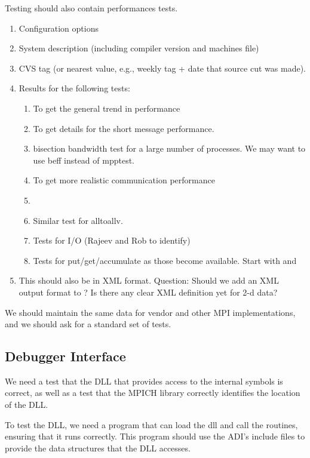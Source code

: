 \documentclass{article}
\begin{document}
Testing should also contain performances tests.
\begin{enumerate}
\item Configuration options
\item System description (including compiler version and machines file)
\item CVS tag (or nearest value, e.g., weekly tag + date that source
cut was made).
\item Results for the following tests:
    \begin{enumerate}
    \item {} To get the general trend in performance
    \item {} To get details for the short message
performance. 
    \item bisection bandwidth test for a large number of processes.
    We may want to use beff instead of mpptest.
    \item {} To get more
    realistic communication performance
    \item {} 
    \item Similar test for alltoallv. 
    \item Tests for I/O (Rajeev and Rob to identify)
    \item Tests for put/get/accumulate as those become available.
    Start with  and 
    \end{enumerate}
\item This should also be in XML format.
    Question: Should we add an XML output format to ?
Is there any clear XML definition yet for 2-d data?

\end{enumerate}
We should maintain the same data for vendor and other MPI
implementations, and we should ask for a standard set of tests.  

\subsection{Debugger Interface}
We need a test that the DLL that provides access to the internal
symbols is correct, as well as a test that the MPICH library correctly
identifies the location of the DLL.

To test the DLL, we need a program  that can
load the dll and call the routines, ensuring that it runs correctly.
This program should use the ADI's include files to provide the data
structures that the DLL accesses.
\end{document}
